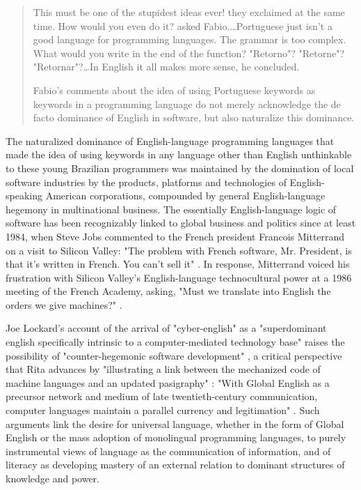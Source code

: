 \blockcquote[53]{Takhteyev12}{
  This must be one of the stupidest ideas ever! they exclaimed at the same time. How would you even do it? asked Fabio.…Portuguese just isn't a good language for programming languages. The grammar is too complex. What would you write in the end of the function? "Retorno"? "Retorne"? "Retornar"?…In English it all makes more sense, he concluded.
  
  Fabio's comments about the idea of using Portuguese keywords as keywords in a programming language do not merely acknowledge the de facto dominance of English in software, but also naturalize this dominance.
}
The naturalized dominance of English-language programming languages that made the idea of using keywords in any language other than English unthinkable to these young Brazilian programmers was maintained by the domination of local software industries by the products, platforms and technologies of English-speaking American corporations, compounded by general English-language hegemony in multinational business. The essentially English-language logic of software has been recognizably linked to global business and politics since at least 1984, when Steve Jobs commented to the French president Francois Mitterrand on a visit to Silicon Valley: "The problem with French software, Mr. President, is that it's written in French. You can't sell it" \autocite[qtd.~in][B4]{Dobbs1986}. In response, Mitterrand voiced his frustration with Silicon Valley's English-language technocultural power at a 1986 meeting of the French Academy, asking, "Must we translate into English the orders we give machines?" \autocite[qtd.~in][B4]{Dobbs1986}.

Joe Lockard's account of the arrival of "cyber-english" as a "superdominant english specifically intrinsic to a computer-mediated technology base" raises the possibility of "counter-hegemonic software development" \autocite{Lockard96}, a critical perspective that Rita \citeauthor{Raley2003} advances by "illustrating a link between the mechanized code of machine languages and an updated pasigraphy" \autocite[306]{Raley2003}: "With Global English as a precursor network and medium of late twentieth-century communication, computer languages maintain a parallel currency and legitimation" \autocite[307]{Raley2003}. Such arguments link the desire for universal language, whether in the form of Global English or the mass adoption of monolingual programming languages, to purely instrumental views of language as the communication of information, and of literacy as developing mastery of an external relation to dominant structures of knowledge and power.

